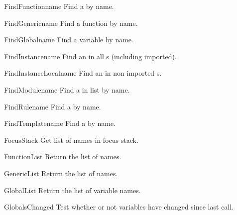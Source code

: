 \begin{funcdesc}{FindFunction}{name}
Find a  by name.
\end{funcdesc}

\begin{funcdesc}{FindGeneric}{name}
Find a  function by name.
\end{funcdesc}

\begin{funcdesc}{FindGlobal}{name}
Find a  variable by name.
\end{funcdesc}

\begin{funcdesc}{FindInstance}{name}
Find an  in all s (including imported).
\end{funcdesc}

\begin{funcdesc}{FindInstanceLocal}{name}
Find an  in non imported s.
\end{funcdesc}

\begin{funcdesc}{FindModule}{name}
Find a  in list by name.
\end{funcdesc}

\begin{funcdesc}{FindRule}{name}
Find a  by name.
\end{funcdesc}

\begin{funcdesc}{FindTemplate}{name}
Find a  by name.
\end{funcdesc}

\begin{funcdesc}{FocusStack}{}
Get list of  names in focus stack.
\end{funcdesc}

\begin{funcdesc}{FunctionList}{}
Return the list of  names.
\end{funcdesc}

\begin{funcdesc}{GenericList}{}
Return the list of  names.
\end{funcdesc}

\begin{funcdesc}{GlobalList}{}
Return the list of  variable names.
\end{funcdesc}

\begin{funcdesc}{GlobalsChanged}{}
Test whether or not  variables have changed since last
call.
\end{funcdesc}


